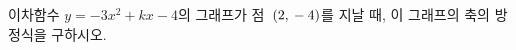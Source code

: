 \hspace*{2mm}\begin{minipage}[t]{\dimexpr\linewidth-2mm\relax}\vspace{0pt}
이차함수 $y=-3x^2+kx-4$의 그래프가 점~$(2{,}\mkern3mu -4)$를 지날 때, 이 그래프의 축의 방정식을 구하시오. \end{minipage}
